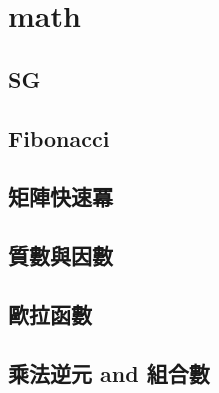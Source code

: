 %         

\section{math}
    \subsection{SG}
        
    \subsection{Fibonacci}
        
    \subsection{矩陣快速冪}
        
    \subsection{質數與因數}
          
    \subsection{歐拉函數}
        
    \subsection{乘法逆元 and 組合數}
        
        
